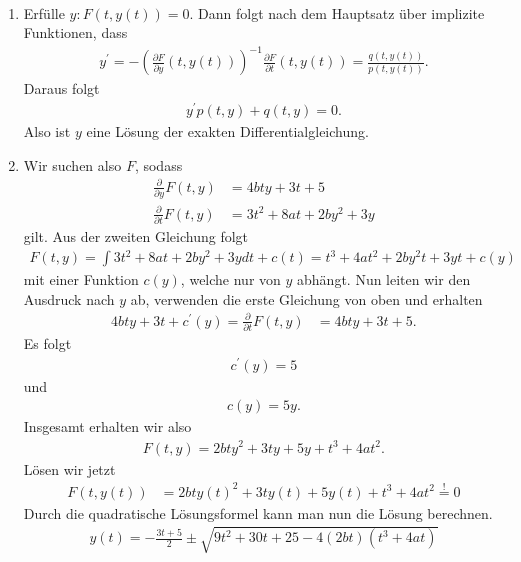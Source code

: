 \begin{solution}
  \phantom{}
\leavevmode \\
\begin{enumerate}[label = \textbf{\alph*)}]
\item Erfülle $y: F(t,y(t)) = 0$. Dann folgt nach dem Hauptsatz über implizite
Funktionen, dass
\begin{align*}
  y^{\prime} = -\left(\frac{\partial F}{\partial y}(t,y(t))\right)^{-1}
  \frac{\partial F}{\partial t}(t,y(t)) = \frac{q(t,y(t))}{p(t,y(t))}.
\end{align*}
Daraus folgt
\begin{align*}
  y^{\prime}p(t,y) + q(t,y) = 0.
\end{align*}
Also ist $y$ eine Lösung der exakten Differentialgleichung.
\item Wir suchen also $F$, sodass
\begin{align*}
  \frac{\partial}{\partial y}F(t,y) &= 4bty + 3t + 5 \\
  \frac{\partial}{\partial t}F(t,y) &= 3t^2 + 8at + 2by^2 + 3y
\end{align*}
gilt. Aus der zweiten Gleichung folgt
\begin{align*}
  F(t,y) = \int 3t^2 + 8at + 2by^2 + 3y dt + c(t) = t^3 +4at^2 + 2by^2 t +3yt + c(y)
\end{align*}
mit einer Funktion $c(y)$, welche nur von $y$ abhängt.
Nun leiten wir den Ausdruck nach $y$ ab, verwenden die erste Gleichung von oben
und erhalten
\begin{align*}
  4bty + 3t + c^{\prime}(y) = \frac{\partial}{\partial t}F(t,y) &= 4bty + 3t + 5.
\end{align*}
Es folgt
\begin{align*}
  c^{\prime}(y) =  5
\end{align*}
und
\begin{align*}
  c(y) = 5y.
\end{align*}
Insgesamt erhalten wir also
\begin{align*}
  F(t,y) = 2bty^2 + 3ty + 5y + t^3 + 4at^2.
\end{align*}
Lösen wir jetzt
\begin{align*}
  F(t,y(t)) &= 2bty(t)^2 + 3ty(t) + 5y(t) + t^3 + 4at^2 \stackrel{!}{=} 0
\end{align*}
Durch die quadratische Lösungsformel kann man nun die Lösung berechnen.
\begin{align*}
  y(t) = - \frac{3t +5}{2} \pm \sqrt{9t^2 + 30t + 25 - 4(2bt)(t^3 + 4at)}
\end{align*}
\end{enumerate}
\end{solution}
